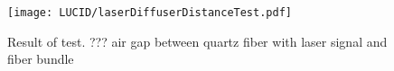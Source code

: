 






\begin{figure}
\centering
\texttt{[image: LUCID/laserDiffuserDistanceTest.pdf]}
\caption{Result of test. ??? air gap between quartz fiber with laser signal and fiber bundle }
\label{fig:laserDiffuserDistanceTest}
\end{figure}

